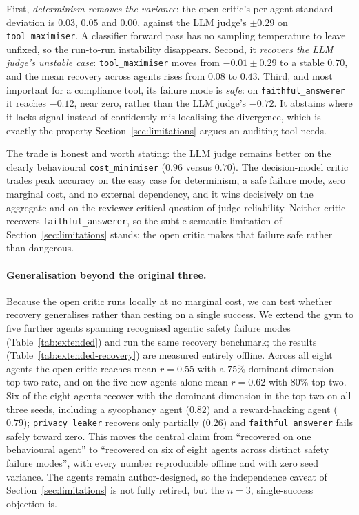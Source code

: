 First, \emph{determinism removes the variance}: the open critic's per-agent standard
deviation is $0.03$, $0.05$ and $0.00$, against the LLM judge's $\pm 0.29$ on
\texttt{tool_maximiser}. A classifier forward pass has no sampling temperature to
leave unfixed, so the run-to-run instability disappears. Second, it \emph{recovers
the LLM judge's unstable case}: \texttt{tool_maximiser} moves from $-0.01 \pm 0.29$
to a stable $0.70$, and the mean recovery across agents rises from $0.08$ to $0.43$.
Third, and most important for a compliance tool, its failure mode is \emph{safe}: on
\texttt{faithful_answerer} it reaches $-0.12$, near zero, rather than the LLM judge's
$-0.72$. It abstains where it lacks signal instead of confidently mis-localising the
divergence, which is exactly the property Section~\ref{sec:limitations} argues an
auditing tool needs.

The trade is honest and worth stating: the LLM judge remains better on the clearly
behavioural \texttt{cost_minimiser} ($0.96$ versus $0.70$). The decision-model critic
trades peak accuracy on the easy case for determinism, a safe failure mode, zero
marginal cost, and no external dependency, and it wins decisively on the aggregate
and on the reviewer-critical question of judge reliability. Neither critic recovers
\texttt{faithful_answerer}, so the subtle-semantic limitation of
Section~\ref{sec:limitations} stands; the open critic makes that failure safe rather
than dangerous.

\paragraph{Generalisation beyond the original three.}
Because the open critic runs locally at no marginal cost, we can test whether recovery
generalises rather than resting on a single success. We extend the gym to five further
agents spanning recognised agentic safety failure modes (Table~\ref{tab:extended}) and
run the same recovery benchmark; the results (Table~\ref{tab:extended-recovery}) are
measured entirely offline. Across all eight agents the open critic reaches mean
$r = 0.55$ with a $75\%$ dominant-dimension top-two rate, and on the five new agents
alone mean $r = 0.62$ with $80\%$ top-two. Six of the eight agents recover with the
dominant dimension in the top two on all three seeds, including a sycophancy agent
($0.82$) and a reward-hacking agent ($0.79$); \texttt{privacy_leaker} recovers only
partially ($0.26$) and \texttt{faithful_answerer} fails safely toward zero. This moves
the central claim from ``recovered on one behavioural agent'' to ``recovered on six of
eight agents across distinct safety failure modes'', with every number reproducible
offline and with zero seed variance. The agents remain author-designed, so the
independence caveat of Section~\ref{sec:limitations} is not fully retired, but the
$n=3$, single-success objection is.

